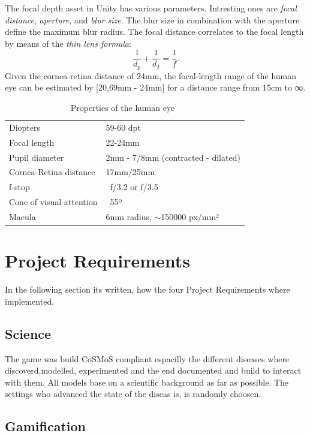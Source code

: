 \documentclass{acm_proc_article-sp}
\begin{document}
The focal depth asset in Unity has various parameters. Intresting ones are \emph{focal distance}, \emph{aperture}, and \emph{blur size}.
The blur size in combination with the aperture define the maximum blur radius.
The focal distance correlates to the focal length by means of the \emph{thin lens formula}:
\begin{equation}
    \frac{1}{d_p} + \frac{1}{d_I} = \frac{1}{f}.
\end{equation}
Given the cornea-retina distance of 24mm, the focal-length range of the human eye can be estimated by [20,69mm - 24mm] for a distance range from 15cm to ∞.
%
\begin{table}
    \centering
    \begin{tabular}{ll}
        Diopters                & 59-60 dpt \\
        Focal length            & 22-24mm\\
        Pupil diameter          & 2mm - 7/8mm (contracted - dilated) \\
        Cornea-Retina distance  & 17mm/25mm \\
        f-stop                  & ~f/3.2 or f/3.5 \\
        Cone of visual attention& ~55º \\
        Macula                  & 6mm radius, $\sim$150000 px/mm²\\
    \end{tabular}
    \caption{Properties of the human eye~\cite{eye-focal, eyeascamera}}
    \label{tab:eyeproperties}
\end{table}


\section{Project Requirements}

In the following section its written, how the four Project Requirements where implemented.

\subsection{Science}

The game was build CoSMoS compliant espacilly the different diseases where discoverd,modelled, experimented and the end documented and build to interact with them. All models base on a scientific background as far as possible. The settings who advanced the state of the diseas is, is randomly choosen.

\subsection{Gamification}
\end{document}
